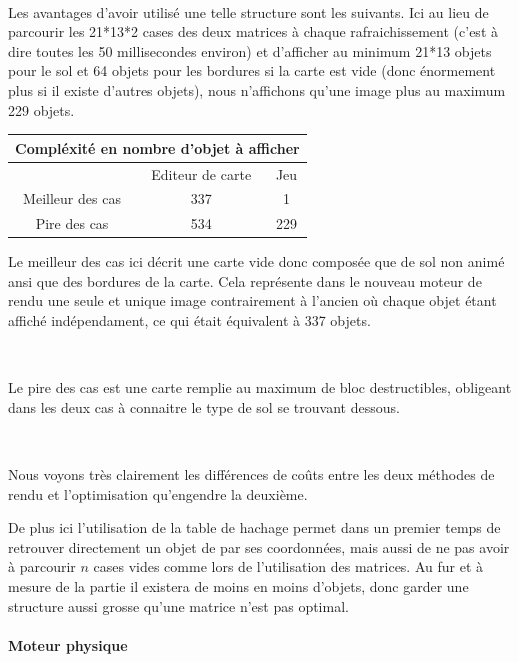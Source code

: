 			$\,$
			
			\newpage

			Les avantages d'avoir utilisé une telle structure sont les suivants. Ici au
			lieu de parcourir les 21*13*2 cases des deux matrices à chaque rafraichissement
			(c'est à dire toutes les 50 millisecondes environ) et d'afficher au minimum
			21*13 objets pour le sol et 64 objets pour les bordures si la carte est vide
			(donc énormement plus si il existe d'autres objets), nous n'affichons qu'une
			image plus au maximum 229 objets.
			
			\begin{center}
				\begin{tabular}{|c|c|c|} \hline
				\multicolumn{3}{c}{Compléxité en nombre d'objet à afficher} \\\hline
				  & Editeur de carte & Jeu    \\\hline 
				Meilleur des cas & 337 & 1    \\\hline
				Pire des cas     & 534 & 229  \\\hline		
				\end{tabular}
			\end{center}
			
			Le meilleur des cas ici décrit une carte vide donc composée que de sol non
			animé ansi que des bordures de la carte. Cela représente dans le nouveau
			moteur de rendu une seule et unique image contrairement à l'ancien où chaque
			objet étant affiché indépendament, ce qui était équivalent à 337 objets.
			
			$\,$
			
			Le pire des cas est une carte remplie au maximum de bloc destructibles,
			obligeant dans les deux cas à connaitre le type de sol se trouvant dessous.
			
			$\,$
			
			Nous voyons très clairement les différences de coûts entre les deux méthodes
			de rendu et l'optimisation qu'engendre la deuxième.
			
			De plus ici l'utilisation de la table de hachage permet dans un premier temps de
			retrouver directement un objet de par ses coordonnées, mais aussi de ne pas
			avoir à parcourir $n$ cases vides comme lors de l'utilisation des matrices.
			Au fur et à mesure de la partie il existera de moins en moins d'objets,
			donc garder une structure aussi grosse qu'une matrice n'est pas optimal.
		
		\paragraph{Moteur physique\\}
		
